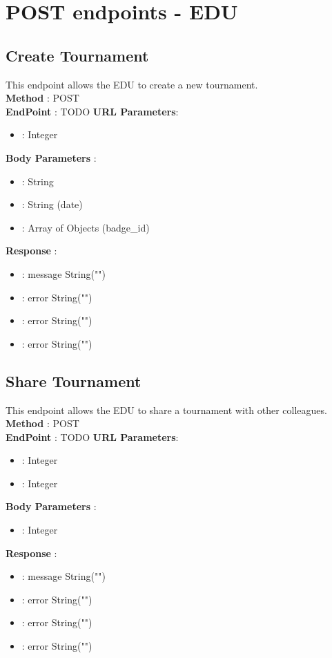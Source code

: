 \section*{POST endpoints - EDU}
\subsection*{Create Tournament}
This endpoint allows the EDU to create a new tournament.\\
\textbf{Method} : POST \\
\textbf{EndPoint} : {\color{blue} TODO}
\textbf{URL Parameters}:
\begin{itemize}
    \item {} : Integer
\end{itemize}
\textbf{Body Parameters} :
\begin{itemize}
    \item {} : String
    \item {} : String (date)
    \item {} : Array of Objects (badge\_id)
\end{itemize}
\textbf{Response} :
\begin{itemize}
    \item {} : message String("")
    \item {} : error String("")
    \item {} : error String("")
    \item {} : error String("")
\end{itemize}

\subsection*{Share Tournament}
This endpoint allows the EDU to share a tournament with other colleagues.\\
\textbf{Method} : POST \\
\textbf{EndPoint} : {\color{blue} TODO}
\textbf{URL Parameters}:
\begin{itemize}
    \item {} : Integer
    \item {} : Integer
\end{itemize}
\textbf{Body Parameters} :
\begin{itemize}
    \item {} : Integer
\end{itemize}
\textbf{Response} :
\begin{itemize}
    \item {} : message String("")
    \item {} : error String("")
    \item {} : error String("")
    \item {} : error String("")
\end{itemize}


